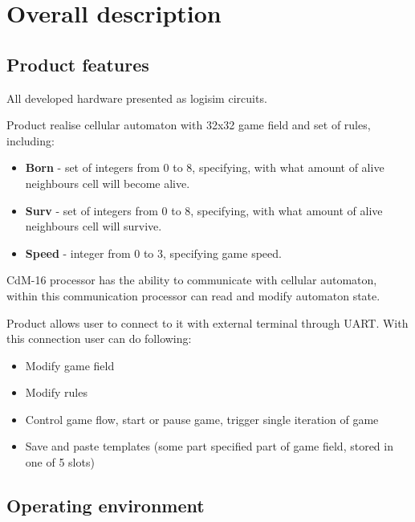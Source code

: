 \chapter*{Overall description}

\section*{Product features}

All developed hardware presented as logisim circuits.

Product realise cellular automaton with 32x32 game field and set of rules, including:

\begin{itemize}
	\item \textbf{Born} - set of integers from 0 to 8, specifying, with what amount of alive neighbours cell will become alive.
	\item \textbf{Surv} - set of integers from 0 to 8, specifying, with what amount of alive neighbours cell will survive.
	\item \textbf{Speed} - integer from 0 to 3, specifying game speed.
\end{itemize}

CdM-16 processor has the ability to communicate with cellular automaton, within this communication processor can read and modify automaton state.

Product allows user to connect to it with external terminal through UART. With this connection user can do following:

\begin{itemize}
	\item Modify game field
	\item Modify rules
	\item Control game flow, start or pause game, trigger single iteration of game
	\item Save and paste templates (some part specified part of game field, stored in one of 5 slots)
\end{itemize}


\section*{Operating environment}

